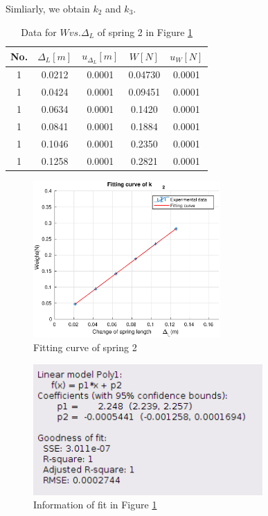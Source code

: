     Simliarly, we obtain $k_2$ and $k_3$.
    \begin{table}[!htbp] \small
        \centering
        \begin{tabular}{|c|c|c|c|c|}
            \hline
            No. & $\Delta_L[m]$ & $u_{\Delta_L}[m]$ & $W[N]$ & $u_{W}[N]$\\ \hline
            1 & 0.0212 & 0.0001 & 0.04730 & 0.0001\\ \hline
            1 & 0.0424 & 0.0001 & 0.09451 & 0.0001\\ \hline
            1 & 0.0634 & 0.0001 & 0.1420 & 0.0001\\ \hline
            1 & 0.0841 & 0.0001 & 0.1884 & 0.0001\\ \hline
            1 & 0.1046 & 0.0001 & 0.2350 & 0.0001\\ \hline
            1 & 0.1258 & 0.0001 & 0.2821 & 0.0001\\ \hline
        \end{tabular}
        \caption{Data for $W vs. \Delta_L$ of spring 2 in Figure \ref{k_2}}\label{k2data}
    \end{table}
    \begin{figure}[!h]
        \centering
        \includegraphics[height=6cm]{images/k2.eps}
        \caption{Fitting curve of spring 2}\label{k_2}
    \end{figure}
    \begin{figure}[!h]
        \centering
        \includegraphics[height=5cm]{images/k2info.png}
        \caption{Information of fit in Figure \ref{k_2}}\label{k2info}
    \end{figure}
